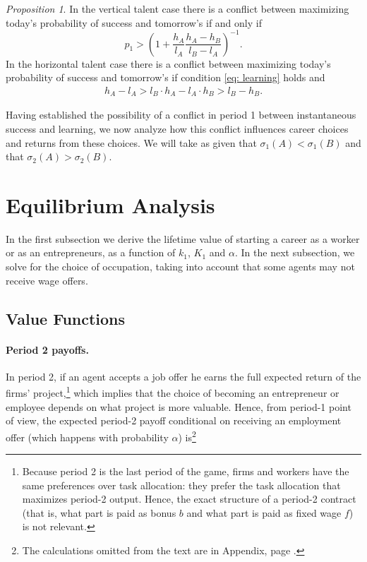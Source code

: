 \documentclass[12pt,american]{paper}
\theoremstyle{remark}
\newtheorem{prop}{Proposition}
\begin{document}
\begin{prop}\label{prop:nsc_learning}
In the vertical talent case there is a conflict between maximizing today's probability of success and tomorrow's if and only if 
\begin{equation}\label{eq: learning}
p_1>\left(1+\frac{h_A}{l_A}\frac{h_A-h_B}{l_B-l_A} \right)^{-1}.
\end{equation}
In the horizontal talent case there is a conflict between maximizing today's probability of success and tomorrow's if condition \eqref{eq: learning} holds and
\begin{align*}
h_A-l_A>l_B \cdot h_A-l_A \cdot h_B >l_B-h_B.
\end{align*}
\end{prop}
Having established the possibility of a conflict in period 1 between instantaneous success and learning, we now analyze how this conflict influences career choices and returns from these choices. We will take as given that $\sigma_1(A)<\sigma_1(B)$ and that $\sigma_2(A)>\sigma_2(B)$.

\section{Equilibrium Analysis}\label{sec:equilibrium}
In the first subsection we derive the lifetime value of starting a career as a worker or as an entrepreneurs, as a function of $k_1$, $K_1$ and $\alpha$.  In the next subsection, we solve for the choice of occupation, taking into account that some agents may not receive wage offers.

\subsection{Value Functions}



\paragraph{Period 2 payoffs.} 
In period 2, if an agent accepts a job offer he earns the full expected return of the firms' project,\footnote{%
Because period 2 is the last period of the game, firms and workers have the same preferences over task allocation: they prefer the task allocation that maximizes period-2 output. Hence, the exact structure of a period-2 contract (that is, what part is paid as bonus $b$ and what part is paid as fixed wage $f$) is not relevant. } which implies that the choice of becoming an entrepreneur or employee depends on what project is more valuable. Hence, from period-1 point of view, the expected period-2 payoff conditional on receiving an employment offer (which happens with probability $\alpha$) is\footnote{The calculations omitted from the text are in Appendix, page \pageref{omitted calculations}. }
\end{document}
